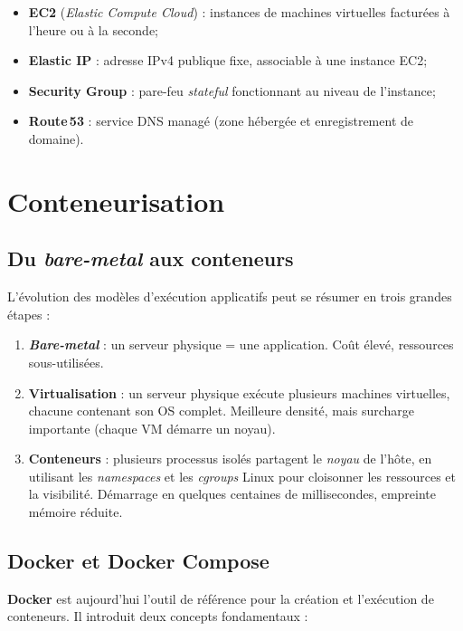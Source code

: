 \begin{itemize}
  \item \textbf{EC2} (\textit{Elastic Compute Cloud}) : instances de
        machines virtuelles facturées à l'heure ou à la seconde;
  \item \textbf{Elastic IP} : adresse IPv4 publique fixe, associable à
        une instance EC2;
  \item \textbf{Security Group} : pare-feu \emph{stateful} fonctionnant
        au niveau de l'instance;
  \item \textbf{Route\,53} : service DNS managé (zone hébergée et
        enregistrement de domaine).
\end{itemize}

\section{Conteneurisation}

\subsection{Du \emph{bare-metal} aux conteneurs}

L'évolution des modèles d'exécution applicatifs peut se résumer en
trois grandes étapes :

\begin{enumerate}
  \item \textbf{\emph{Bare-metal}} : un serveur physique = une
        application. Coût élevé, ressources sous-utilisées.
  \item \textbf{Virtualisation} : un serveur physique exécute plusieurs
        machines virtuelles, chacune contenant son OS complet. Meilleure
        densité, mais surcharge importante (chaque VM démarre un noyau).
  \item \textbf{Conteneurs} : plusieurs processus isolés partagent le
        \emph{noyau} de l'hôte, en utilisant les \emph{namespaces} et
        les \emph{cgroups} Linux pour cloisonner les ressources et la
        visibilité. Démarrage en quelques centaines de millisecondes,
        empreinte mémoire réduite.
\end{enumerate}

\subsection{Docker et Docker Compose}

\textbf{Docker} est aujourd'hui l'outil de référence pour la création
et l'exécution de conteneurs. Il introduit deux concepts fondamentaux :

